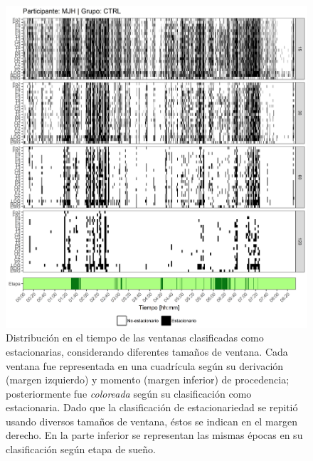 \begin{figure}
\centering
\includegraphics[width=\linewidth]
{./scripts_graf_res/MJH_patrones_2.png}
\caption[Distribución en el tiempo de las ventanas clasificadas como estacionarias, considerando diferentes tamaños de ventana]{Distribución en el tiempo de las ventanas clasificadas como estacionarias, considerando diferentes tamaños de ventana. 
Cada ventana fue representada en una cuadrícula según su derivación (margen izquierdo) y momento (margen inferior) de procedencia; posteriormente fue \textit{coloreada} según su clasificación como estacionaria.
Dado que la clasificación de estacionariedad se repitió usando diversos tamaños de ventana, éstos se indican en el margen derecho.
En la parte inferior se representan las mismas épocas en su clasificación según etapa de sueño.}
\end{figure}


